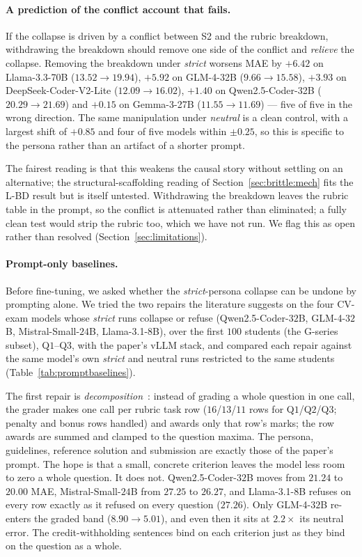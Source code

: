 \paragraph{A prediction of the conflict account that fails.}
If the collapse is driven by a conflict between S2 and the rubric breakdown, withdrawing the breakdown should remove one side of the conflict and \emph{relieve} the collapse. Removing the breakdown under \emph{strict} worsens MAE by $+6.42$ on Llama-3.3-70B ($13.52 \to 19.94$), $+5.92$ on GLM-4-32B ($9.66 \to 15.58$), $+3.93$ on DeepSeek-Coder-V2-Lite ($12.09 \to 16.02$), $+1.40$ on Qwen2.5-Coder-32B ($20.29 \to 21.69$) and $+0.15$ on Gemma-3-27B ($11.55 \to 11.69$) --- five of five in the wrong direction. The same manipulation under \emph{neutral} is a clean control, with a largest shift of $+0.85$ and four of five models within $\pm 0.25$, so this is specific to the persona rather than an artifact of a shorter prompt.

The fairest reading is that this weakens the causal story without settling on an alternative; the structural-scaffolding reading of Section~\ref{sec:brittle:mech} fits the L-BD result but is itself untested. Withdrawing the breakdown leaves the rubric table in the prompt, so the conflict is attenuated rather than eliminated; a fully clean test would strip the rubric too, which we have not run. We flag this as open rather than resolved (Section~\ref{sec:limitations}).

\clearpage
\paragraph{Prompt-only baselines.}
\label{app:promptbaselines}
Before fine-tuning, we asked whether the \emph{strict}-persona collapse can be undone by prompting alone. We tried the two repairs the literature suggests on the four CV-exam models whose \emph{strict} runs collapse or refuse (Qwen2.5-Coder-$32$B, GLM-4-$32$B, Mistral-Small-$24$B, Llama-3.1-$8$B), over the first $100$ students (the G-series subset), Q$1$--Q$3$, with the paper's vLLM stack, and compared each repair against the same model's own \emph{strict} and neutral runs restricted to the same students (Table~\ref{tab:promptbaselines}).

The first repair is \emph{decomposition}~\citep{pathak2025rubricneedenhancingllmbased}: instead of grading a whole question in one call, the grader makes one call per rubric task row ($16$/$13$/$11$ rows for Q$1$/Q$2$/Q$3$; penalty and bonus rows handled) and awards only that row's marks; the row awards are summed and clamped to the question maxima. The persona, guidelines, reference solution and submission are exactly those of the paper's prompt. The hope is that a small, concrete criterion leaves the model less room to zero a whole question. It does not. Qwen2.5-Coder-$32$B moves from $21.24$ to $20.00$ MAE, Mistral-Small-$24$B from $27.25$ to $26.27$, and Llama-3.1-$8$B refuses on every row exactly as it refused on every question ($27.26$). Only GLM-4-$32$B re-enters the graded band ($8.90 \to 5.01$), and even then it sits at $2.2\times$ its neutral error. The credit-withholding sentences bind on each criterion just as they bind on the question as a whole.

